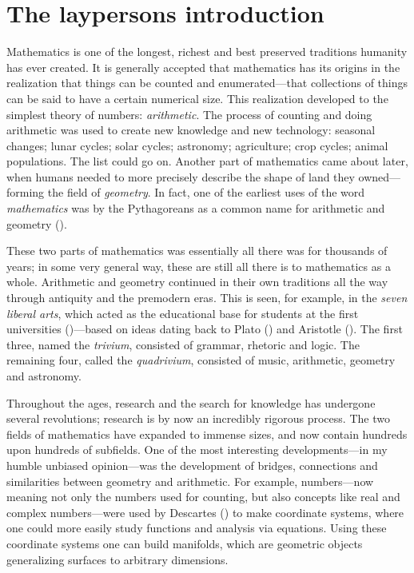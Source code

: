 
\section{The laypersons introduction}

Mathematics is one of the longest, richest and best preserved traditions humanity has ever created. It is generally accepted that mathematics has its origins in the realization that things can be counted and enumerated---that collections of things can be said to have a certain numerical size. This realization developed to the simplest theory of numbers: \emph{arithmetic}. The process of counting and doing arithmetic was used to create new knowledge and new technology: seasonal changes; lunar cycles; solar cycles; astronomy; agriculture; crop cycles; animal populations. The list could go on. Another part of mathematics came about later, when humans needed to more precisely describe the shape of land they owned---forming the field of \emph{geometry}. In fact, one of the earliest uses of the word \emph{mathematics} was by the Pythagoreans as a common name for arithmetic and geometry (\cite[1.1]{history}).

These two parts of mathematics was essentially all there was for thousands of years; in some very general way, these are still all there is to mathematics as a whole. Arithmetic and geometry continued in their own traditions all the way through antiquity and the premodern eras. This is seen, for example, in the \emph{seven liberal arts}, which acted as the educational base for students at the first universities (\cite{universities})---based on ideas dating back to Plato (\cite{plato}) and Aristotle (\cite{aristotle}). The first three, named the \emph{trivium}, consisted of grammar, rhetoric and logic. The remaining four, called the \emph{quadrivium}, consisted of music, arithmetic, geometry and astronomy.

Throughout the ages, research and the search for knowledge has undergone several revolutions; research is by now an incredibly rigorous process. The two fields of mathematics have expanded to immense sizes, and now contain hundreds upon hundreds of subfields. One of the most interesting developments---in my humble unbiased opinion---was the development of bridges, connections and similarities between geometry and arithmetic. For example, numbers---now meaning not only the numbers used for counting, but also concepts like real and complex numbers---were used by Descartes (\cite{descartes}) to make coordinate systems, where one could more easily study functions and analysis via equations. Using these coordinate systems one can build manifolds, which are geometric objects generalizing surfaces to arbitrary dimensions. 

